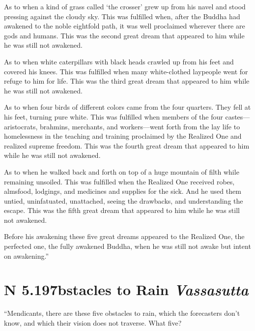 \documentclass[12pt,openany]{book}%
\newcommand*{\suttatitleacronym}[1]{\smaller[2]{#1}\vspace*{.3em}}
\newcommand*{\suttatitletranslation}[1]{\linebreak{#1}}
\newcommand*{\suttatitleroot}[1]{\linebreak\smaller[2]\itshape{#1}}
\newcommand*{\tocacronym}[1]{\hspace*{-3.3em}{#1}\quad}
\newcommand*{\toctranslation}[1]{#1}
\newcommand*{\tocroot}[1]{(\textit{#1})}
\begin{document}
As to when a kind of grass called ‘the crosser’ grew up from his navel and stood pressing against the cloudy sky. This was fulfilled when, after the Buddha had awakened to the noble eightfold path, it was well proclaimed wherever there are gods and humans. This was the second great dream that appeared to him while he was still not awakened. 

As to when white caterpillars with black heads crawled up from his feet and covered his knees. This was fulfilled when many white-clothed laypeople went for refuge to him for life. This was the third great dream that appeared to him while he was still not awakened. 

As to when four birds of different colors came from the four quarters. They fell at his feet, turning pure white. This was fulfilled when members of the four castes—aristocrats, brahmins, merchants, and workers—went forth from the lay life to homelessness in the teaching and training proclaimed by the Realized One and realized supreme freedom. This was the fourth great dream that appeared to him while he was still not awakened. 

As to when he walked back and forth on top of a huge mountain of filth while remaining unsoiled. This was fulfilled when the Realized One received robes, almsfood, lodgings, and medicines and supplies for the sick. And he used them untied, uninfatuated, unattached, seeing the drawbacks, and understanding the escape. This was the fifth great dream that appeared to him while he was still not awakened. 

Before his awakening these five great dreams appeared to the Realized One, the perfected one, the fully awakened Buddha, when he was still not awake but intent on awakening.” 

%
\section*{{\suttatitleacronym AN 5.197}{\suttatitletranslation Obstacles to Rain }{\suttatitleroot Vassasutta}}
\addcontentsline{toc}{section}{\tocacronym{AN 5.197} \toctranslation{Obstacles to Rain } \tocroot{Vassasutta}}

“Mendicants, there are these five obstacles to rain, which the forecasters don’t know, and which their vision does not traverse. What five? 
\end{document}
